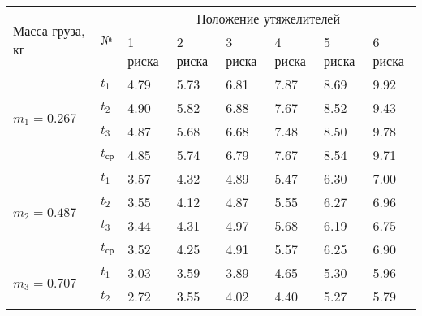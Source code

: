 \begin{center}
    \begin{tabular}{|p{2.3cm}|p{0.5cm}|p{1.5cm}|p{1.5cm}|p{1.5cm}|p{1.5cm}|p{1.5cm}|p{1.5cm}|}
        \hline
        \multirow{2}{2.3cm}{Масса груза, кг} & \multirow{2}{*}{№} & \multicolumn{6}{c|}{Положение утяжелителей} \\
        \cline{3-8}
         & & 1 риска       & 2 риска & 3 риска & 4 риска & 5 риска & 6 риска \\
        \hline
        \multirow{4}{*}{$m_1 = 0.267$} & $t_1$ &    4.79     &     5.73    &     6.81    &    7.87     &   8.69      &     9.92    \\
        \cline{2-8}
        & $t_2$ &   4.90     &     5.82    &     6.88    &     7.67    &     8.52    &    9.43     \\
        \cline{2-8}
        & $t_3$ &   4.87     &     5.68    &     6.68    &     7.48    &    8.50     &    9.78     \\
        \cline{2-8}
        & $t_\text{ср}$ &  4.85  &    5.74     &    6.79     &    7.67     &    8.54     &     9.71    \\
        \hline
        \multirow{4}{*}{$m_2 = 0.487$} & $t_1$ &      3.57        &     4.32    &    4.89     &     5.47    &     6.30    &     7.00    \\
        \cline{2-8}
        & $t_2$ &       3.55        &     4.12    &     4.87    &     5.55    &     6.27    &   6.96      \\
        \cline{2-8}
        & $t_3$ &       3.44        &     4.31    &     4.97    &     5.68    &    6.19     &   6.75     \\
        \cline{2-8}
        & $t_\text{ср}$ &      3.52         &    4.25     &    4.91    &   5.57      &     6.25    &     6.90    \\
        \hline
        \multirow{4}{*}{$m_3 = 0.707$} & $t_1$ &      3.03        &     3.59    &     3.89    &    4.65     &    5.30     &     5.96    \\
        \cline{2-8}
        & $t_2$ &       2.72        &     3.55    &     4.02    &    4.40     &    5.27     &    5.79     \\

\end{tabular}
\end{center}
